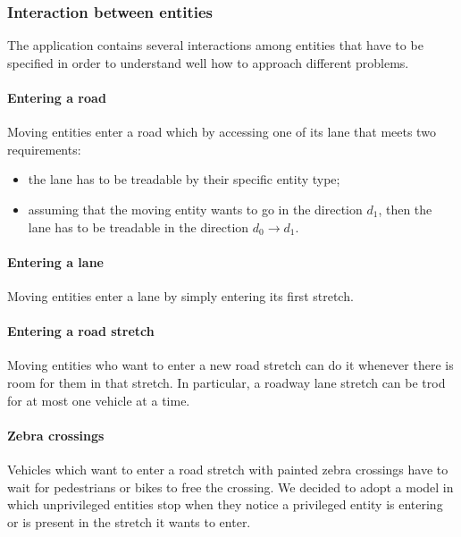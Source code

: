 \subsubsection{Interaction between entities}

The application contains several interactions among entities that have to be
specified in order to understand well how to approach different problems.

\paragraph{Entering a road} Moving entities enter a road which by accessing
one of its lane that meets two requirements:

\begin{itemize}
  \item the lane has to be treadable by their specific entity type;
  \item assuming that the moving entity wants to go in the direction $d_1$,
    then the lane has to be treadable in the direction $d_0 \rightarrow d_1$.
\end{itemize}

\paragraph{Entering a lane}
Moving entities enter a lane by simply entering its first stretch.

\paragraph{Entering a road stretch}
Moving entities who want to enter a new road stretch can do it whenever there
is room for them in that stretch.
In particular, a roadway lane stretch can be trod for at most one vehicle at a
time.

\paragraph{Zebra crossings}
Vehicles which want to enter a road stretch with painted zebra crossings have
to wait for pedestrians or bikes to free the crossing.
We decided to adopt a model in which unprivileged entities stop when they
notice a privileged entity is entering or is present in the stretch it wants
to enter.


